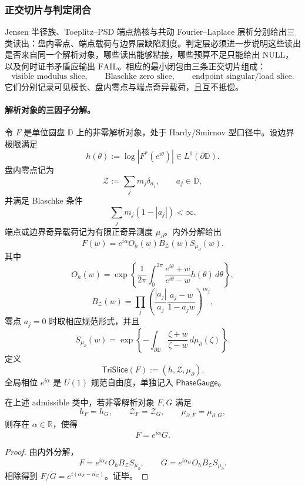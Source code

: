 \subsubsection{正交切片与判定闭合}\label{subsubsec:typed-address-biaxial-completion-orthogonal-trislice-decision-closure}
Jensen 半径族、Toeplitz--PSD 端点热核与共动 Fourier--Laplace 层析分别给出三类读出：盘内零点、端点载荷与边界层缺陷测度。判定层必须进一步说明这些读出是否来自同一个解析对象，哪些读出能够粘接，哪些预算不足只能给出 \(\mathrm{NULL}\)，以及何时证书矛盾应输出 \(\mathrm{FAIL}\)。相应的最小闭包由三条正交切片组成：
\[
\text{visible modulus slice},
\qquad
\text{Blaschke zero slice},
\qquad
\text{endpoint singular/load slice}.
\]
它们分别记录可见模长、盘内零点与端点奇异载荷，且互不抵偿。

\paragraph{解析对象的三因子分解。}
令 \(F\) 是单位圆盘 \(\mathbb D\) 上的非零解析对象，处于 Hardy/Smirnov 型口径中。设边界极限满足
\[
h(\theta):=\log|F^*(e^{i\theta})|\in L^1(\partial\mathbb D).
\]
盘内零点记为
\[
\mathcal Z:=\sum_j m_j\delta_{a_j},
\qquad
a_j\in\mathbb D,
\]
并满足 Blaschke 条件
\[
\sum_jm_j(1-|a_j|)<\infty.
\]
端点或边界奇异载荷记为有限正奇异测度 \(\mu_\partial\)。内外分解给出
\[
\boxed{
F(w)=
e^{i\alpha}
O_h(w)
B_{\mathcal Z}(w)
S_{\mu_\partial}(w).
}
\]
其中
\[
O_h(w)
=
\exp\left\{
\frac1{2\pi}
\int_0^{2\pi}
\frac{e^{i\theta}+w}{e^{i\theta}-w}
h(\theta)\,d\theta
\right\},
\]
\[
B_{\mathcal Z}(w)
=
\prod_j
\left(
\frac{|a_j|}{a_j}
\frac{a_j-w}{1-\overline a_j w}
\right)^{m_j},
\]
零点 \(a_j=0\) 时取相应规范形式，并且
\[
S_{\mu_\partial}(w)
=
\exp\left\{
-\int_{\partial\mathbb D}
\frac{\zeta+w}{\zeta-w}\,d\mu_\partial(\zeta)
\right\}.
\]
定义
\[
\boxed{
\mathsf{TriSlice}(F):=(h,\mathcal Z,\mu_\partial).
}
\]
全局相位 \(e^{i\alpha}\) 是 \(U(1)\) 规范自由度，单独记入 \(\mathsf{PhaseGauge}\)。

\begin{theorem}[正交三切片唯一性]\label{thm:typed-address-biaxial-completion-orthogonal-trislice-uniqueness}
在上述 admissible 类中，若非零解析对象 \(F,G\) 满足
\[
h_F=h_G,
\qquad
\mathcal Z_F=\mathcal Z_G,
\qquad
\mu_{\partial,F}=\mu_{\partial,G},
\]
则存在 \(\alpha\in\mathbb R\)，使得
\[
F=e^{i\alpha}G.
\]
\end{theorem}
\begin{proof}
由内外分解，
\[
F=e^{i\alpha_F}O_hB_{\mathcal Z}S_{\mu_\partial},
\qquad
G=e^{i\alpha_G}O_hB_{\mathcal Z}S_{\mu_\partial}.
\]
相除得到 \(F/G=e^{i(\alpha_F-\alpha_G)}\)。证毕。
\end{proof}

